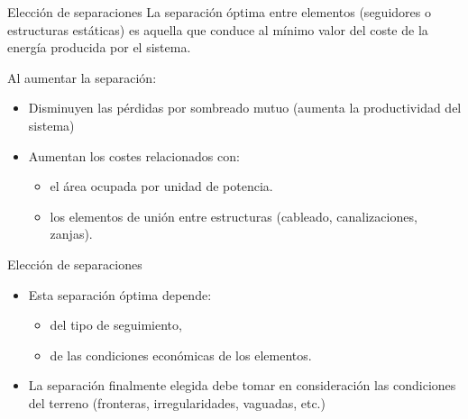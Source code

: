\documentclass[aspectratio=169, usenames,svgnames,dvipsnames]{beamer}
\begin{document}
\begin{frame}[label={sec:orgbe9e45a}]{Elección de separaciones}
La \alert{separación óptima} entre elementos (seguidores o estructuras
estáticas) es aquella que conduce al \alert{mínimo valor del coste de la
energía} producida por el sistema.

Al aumentar la separación:

\begin{itemize}
\item Disminuyen las \alert{pérdidas por sombreado mutuo} (aumenta la
productividad del sistema)

\item Aumentan \alert{los costes relacionados con}:

\begin{itemize}
\item \alert{el área ocupada} por unidad de potencia.
\item \alert{los elementos de unión entre estructuras} (cableado, canalizaciones, zanjas).
\end{itemize}
\end{itemize}
\end{frame}

\begin{frame}[label={sec:org4d8484e}]{Elección de separaciones}
\begin{itemize}
\item Esta separación óptima \alert{depende}:

\begin{itemize}
\item del \alert{tipo de seguimiento},

\item de las \alert{condiciones económicas} de los elementos.
\end{itemize}

\item La separación finalmente elegida debe \alert{tomar en consideración las
condiciones del terreno} (fronteras, irregularidades, vaguadas, etc.)
\end{itemize}
\end{frame}
\end{document}
